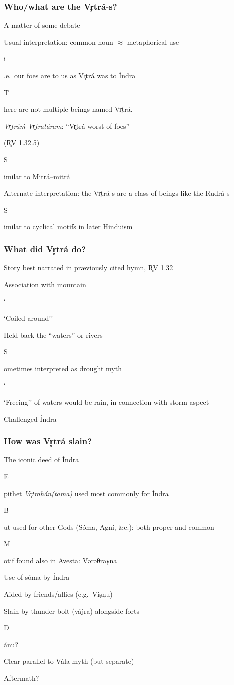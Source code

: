 \documentclass[pdf]{beamer}
\newcommand{\Subitem}[1]{{\setlength\itemindent{12pt} \item[-] #1}}
\newcommand{\Subsubitem}[1]{{\setlength\itemindent{24pt} \item[○] #1}}
\begin{document}
\begin{frame} \frametitle{Who/what are the Vr̥trá-s?}
\begin{itemize}
	\item A matter of some debate
	\item Usual interpretation: common noun $\approx$ metaphorical use
	\Subitem i.e.~our foes are to us as Vr̥trá was to Índra
	\Subitem There are not multiple beings named Vr̥trá.
	\Subitem {\textit{Vr̥tráṁ Vr̥tratáram}: ``Vr̥trá worst of foes”} (R̥V 1.32.5)
	\Subitem Similar to Mitrá--mitrá
	\item Alternate interpretation: the Vr̥trá-s are a class of beings like the Rudrá-s
	\Subitem Similar to cyclical motifs in later Hinduism
\end{itemize}
\end{frame}

\begin{frame} \frametitle{What did Vr̥trá do?}
\begin{itemize}
	\item Story best narrated in præviously cited hymn, R̥V 1.32
	\item Association with mountain
	\Subitem ``Coiled around''
	\item Held back the ``waters'' or rivers
	\Subitem Sometimes interpreted as drought myth
	\Subitem ``Freeing'' of waters would be rain, in connection with storm-aspect
	\item Challenged Índra
\end{itemize}
\end{frame}

\begin{frame} \frametitle{How was Vr̥trá slain?}
\begin{itemize}
	\item The iconic deed of Índra
	\Subitem Epithet \textit{Vr̥trahán(tama)} used most commonly for Índra
	\Subsubitem But used for other Gods (Sóma, Agní, \&c.): both proper and common
	\Subitem Motif found also in Avesta: Vǝrǝθraγna
	\item Use of sóma by Índra
	\item Aided by friends/allies (e.g.~Víṣṇu)
	\item Slain by thunder-bolt (vájra) alongside forts
	\Subitem Dā́nu?
	\item Clear parallel to Vála myth (but separate)
	\item Aftermath?
\end{itemize}
\end{frame}

\end{document}
